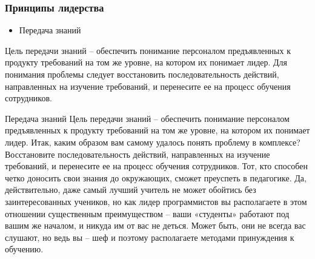 \documentclass{../industrial-development}
\begin{document}
\begin{frame} \frametitle{Принципы лидерства}
 \begin{block}{}
\begin{itemize}
  \item Передача знаний
  \end{itemize}
 \end{block}
Цель передачи знаний – обеспечить понимание персоналом предъявленных к продукту требований на том же уровне, на котором их понимает лидер.  Для понимания проблемы следует восстановить последовательность действий, направленных на изучение требований, и перенесите ее на процесс обучения сотрудников. 
\end{frame}
\lecturenotes
Передача знаний
Цель передачи знаний – обеспечить понимание персоналом предъявленных к продукту требований на том же уровне, на котором их понимает лидер. Итак, каким образом вам самому удалось понять проблему в комплексе? Восстановите последовательность действий, направленных на изучение требований, и перенесите ее на процесс обучения сотрудников. Тот, кто способен четко доносить свои знания до окружающих, сможет преуспеть в педагогике. Да, действительно, даже самый лучший учитель не может обойтись без заинтересованных учеников, но как лидер программистов вы располагаете в этом отношении существенным преимуществом – ваши «студенты» работают под вашим же началом, и никуда им от вас не деться. Может быть, они не всегда вас слушают, но ведь вы – шеф и поэтому располагаете методами принуждения к обучению.

~\cite{How_to_be_a_good_IT-manager}
\end{document}
